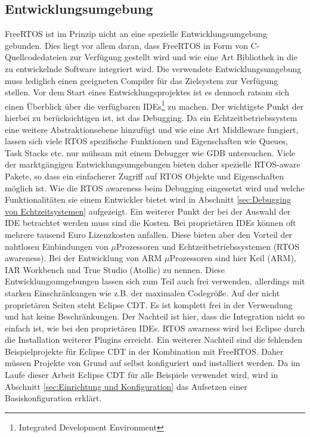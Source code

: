 \subsection{Entwicklungsumgebung}
FreeRTOS ist im Prinzip nicht an eine spezielle Entwicklungsumgebung gebunden. Dies liegt vor allem daran, dass FreeRTOS in Form von C-Quellcodedateien zur Verfügung gestellt wird und wie eine Art Bibliothek in die zu entwickelnde Software integriert wird. Die verwendete Entwicklungsumgebung muss lediglich einen geeigneten Compiler für das Zielsystem zur Verfügung stellen. Vor dem Start eines Entwicklungsprojektes ist es dennoch ratsam sich einen Überblick über die ver\-fügbaren IDEs\footnote{Integrated Development Environment} zu machen. Der wichtigste Punkt der hierbei zu berücksichtigen ist, ist das Debugging. Da ein Echtzeitbetriebssystem eine weitere Abstraktionsebene hinzufügt und wie eine Art Middleware fungiert, lassen sich viele RTOS spezifische Funktionen und Eigenschaften wie Queues, Task Stacks etc. nur mühsam mit einem Debugger wie GDB untersuchen. Viele der markt\-gäng\-igen Entwicklungsumgebungen bieten daher spezielle RTOS-aware Pakete, so dass ein einfacherer Zugriff auf RTOS Objekte und Eigenschaften möglich ist. Wie die RTOS awareness beim Debugging eingesetzt wird und welche Funktionalitäten sie einem Entwickler bietet wird in Abschnitt \ref{sec:Debugging von Echtzeitsystemen} aufgezeigt. Ein weiterer Punkt der bei der Auswahl der IDE betrachtet werden muss sind die Kosten. Bei proprietären IDEs können oft mehrere tausend Euro Lizenzkosten anfallen. Diese bieten aber den Vorteil der nahtlosen Einbindungen von $\mu$Prozessoren und Echtzeitbetriebssystemen (RTOS awareness). Bei der Entwicklung von ARM $\mu$\-Prozessoren sind hier Keil (ARM), IAR Workbench und True Studio (Atollic) zu nennen. Diese Entwicklungsumgebungen lassen sich zum Teil auch frei verwenden, allerdings mit starken Einschränkungen wie z.B. der maximalen Codegröße. Auf der nicht proprietären Seiten steht Eclipse CDT. Es ist komplett frei in der Verwendung und hat keine Beschränkungen. Der Nachteil ist hier, dass die Integration nicht so einfach ist, wie bei den proprietären IDEs. RTOS awarness wird bei Eclipse durch die Installation weiterer Plugins erreicht. Ein weiterer Nachteil sind die fehlenden Beispielprojekte für Eclipse CDT in der Kombination mit FreeRTOS. Daher müssen Projekte von Grund auf selbst konfiguriert und installiert werden. Da im Laufe dieser Arbeit Eclipse CDT für alle Beispiele verwendet wird, wird in Abschnitt \ref{sec:Einrichtung und Konfiguration} das Aufsetzen einer Basiskonfiguration erklärt. 

